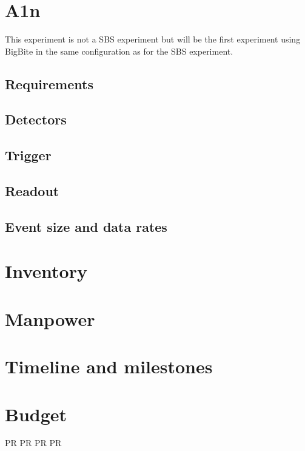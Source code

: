 \documentclass{article}
\begin{document}
\section{A1n}
This experiment is not a SBS experiment but will be the first experiment using BigBite in the
same configuration as for the SBS experiment.

\subsection{Requirements}
\subsection{Detectors}
\subsection{Trigger}

\subsection{Readout}

\subsection{Event size and data rates}
\section{Inventory}

\section{Manpower}

\section{Timeline and milestones}

\section{Budget}
\begin{thebibliography}{9}
 PR
 PR
 PR
 PR
\end{thebibliography}
\end{document}

